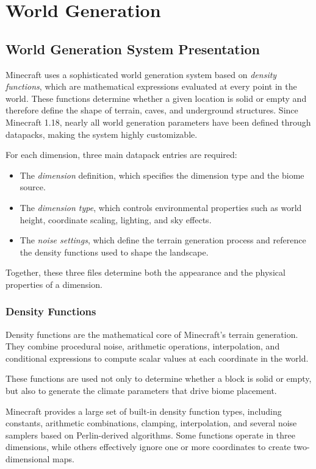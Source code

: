 \documentclass{article}
\begin{document}
\section{World Generation}

\subsection{World Generation System Presentation}

Minecraft uses a sophisticated world generation system based on \textit{density functions}, which are mathematical expressions evaluated at every point in the world. These functions determine whether a given location is solid or empty and therefore define the shape of terrain, caves, and underground structures. Since Minecraft 1.18, nearly all world generation parameters have been defined through datapacks, making the system highly customizable.

For each dimension, three main datapack entries are required:

\begin{itemize}
    \item The \textit{dimension} definition, which specifies the dimension type and the biome source.
    \item The \textit{dimension type}, which controls environmental properties such as world height, coordinate scaling, lighting, and sky effects.
    \item The \textit{noise settings}, which define the terrain generation process and reference the density functions used to shape the landscape.
\end{itemize}

Together, these three files determine both the appearance and the physical properties of a dimension.

\subsubsection{Density Functions}

Density functions are the mathematical core of Minecraft's terrain generation. They combine procedural noise, arithmetic operations, interpolation, and conditional expressions to compute scalar values at each coordinate in the world.

These functions are used not only to determine whether a block is solid or empty, but also to generate the climate parameters that drive biome placement.

Minecraft provides a large set of built-in density function types, including constants, arithmetic combinations, clamping, interpolation, and several noise samplers based on Perlin-derived algorithms. Some functions operate in three dimensions, while others effectively ignore one or more coordinates to create two-dimensional maps.
\end{document}
